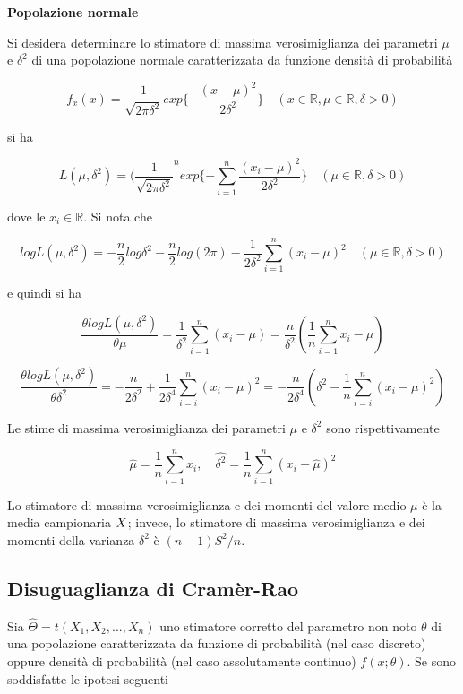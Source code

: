 \vspace{5mm}
\noindent \textbf{Popolazione normale}

Si desidera determinare lo stimatore di massima verosimiglianza dei parametri $\mu$ e $\delta^2$ di una popolazione normale caratterizzata da funzione densità di probabilità

\[f_x(x) = \frac{1}{\sqrt{2\pi \delta^2}} exp\{-\frac{(x - \mu)^2}{2\delta^2}\} \quad (x \in \mathbb{R}, \mu \in \mathbb{R}, \delta > 0)\]

si ha

\[L(\mu, \delta^2) = (\frac{1}{\sqrt{2\pi \delta^2}}^n exp\{-\sum_{i=1}^n \frac{(x_i - \mu)^2}{2\delta^2}\} \quad (\mu \in \mathbb{R}, \delta > 0)\]

dove le $x_i \in \mathbb{R}$. Si nota che

\[log L(\mu, \delta^2) = -\frac{n}{2}log\delta^2 - \frac{n}{2}log(2\pi) - \frac{1}{2\delta^2}\sum_{i=1}^n(x_i - \mu)^2 \quad (\mu \in \mathbb{R}, \delta > 0)\]

e quindi si ha

\[\frac{\theta logL(\mu, \delta^2)}{\theta \mu} = \frac{1}{\delta^2}\sum_{i=1}^n(x_i - \mu) = \frac{n}{\delta^2}(\frac{1}{n}\sum_{i=1}^n x_i - \mu)\]

\[\frac{\theta logL(\mu, \delta^2)}{\theta \delta^2} = -\frac{n}{2\delta^2} + \frac{1}{2\delta^4}\sum_{i=i}^n(x_i - \mu)^2 = -\frac{n}{2\delta^4}(\delta^2 - \frac{1}{n} \sum_{i=i}^n (x_i - \mu)^2)\]

Le stime di massima verosimiglianza dei parametri $\mu$ e $\delta^2$ sono rispettivamente

\[\hat{\mu} = \frac{1}{n}\sum_{i=1}^n x_i, \quad \hat{\delta^2} = \frac{1}{n}\sum_{i=1}^n (x_i - \hat{\mu})^2\]

Lo stimatore di massima verosimiglianza e dei momenti del valore medio $\mu$ è la media campionaria $\Bar{X}$; invece, lo stimatore di massima verosimiglianza e dei momenti della varianza $\delta^2$ è $(n-1)S^2/n$.

\subsection{Disuguaglianza di Cramèr-Rao}

Sia $\hat{\Theta} = t(X_1, X_2, ..., X_n)$ uno stimatore corretto del parametro non noto $\theta$ di una popolazione caratterizzata da funzione di probabilità (nel caso discreto) oppure densità di probabilità (nel caso assolutamente continuo) $f(x;\theta)$. Se sono soddisfatte le ipotesi seguenti

